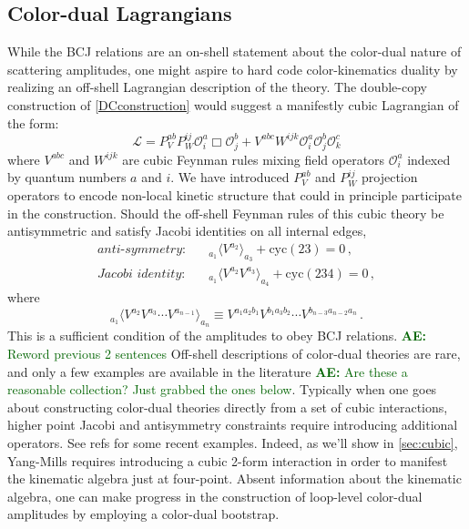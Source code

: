 \documentclass[11pt,letter]{article}
\newcommand{\ace}[1]{\textcolor{darkgreen}{\textbf{AE:}{ #1}}}
\begin{document}
\subsection{Color-dual Lagrangians}\label{offShellCK}
While the BCJ relations are an on-shell statement about the color-dual
nature of scattering amplitudes, one might aspire to hard code
color-kinematics duality by realizing an off-shell Lagrangian
description of the theory. The double-copy construction of
\cref{DCconstruction} would suggest a manifestly cubic Lagrangian of
the form:
\begin{equation}
\mathcal{L} = P_V^{ab}P_W^{ij}\mathcal{O}^a_i \Box \mathcal{O}^b_j +  V^{abc} W^{ijk}\mathcal{O}^a_i \mathcal{O}^b_j \mathcal{O}^c_k
\end{equation}
where $V^{abc}$ and $W^{ijk}$ are cubic Feynman rules mixing field
operators $\mathcal{O}^{a}_i$ indexed by quantum numbers $a$ and
$i$. We have introduced $P_V^{ab}$ and $P_W^{ij}$ projection operators
to encode non-local kinetic structure that could in principle
participate in the construction. Should the off-shell Feynman rules of
this cubic theory be antisymmetric and satisfy Jacobi identities on
all internal edges,
\begin{align}
\textit{anti-symmetry}:& \quad{}_{a_1}\langle V^{a_2} \rangle_{a_3}+\text{cyc}(23)=0\,,
\\
\textit{Jacobi identity}:& \quad {}_{a_1}\langle V^{a_2} V^{a_3}\rangle_{a_4}+\text{cyc}(234)=0\,,
\end{align}
where 
\begin{equation}
{}_{a_1}\langle V^{a_2}V^{a_3}\cdots V^{a_{n-1}} \rangle_{a_n} \equiv V^{a_1a_2b_1}V^{b_1a_3b_2}\cdots V^{b_{n-3} a_{n-2}a_n}\,.
\end{equation}
This is a sufficient condition of the amplitudes to obey BCJ
relations. \ace{Reword previous 2 sentences} Off-shell descriptions of
color-dual theories are rare, and only a few examples are available in
the literature \cite{Monteiro2011pc, Cheung:2016prv, Cheung:2021zvb,
  Cheung:2020djz, Ben-Shahar:2022ixa, Ben-Shahar:2021zww,
  Ben-Shahar:2021doh}\ace{Are these a reasonable
  collection?  Just grabbed the ones below}. Typically when one goes about constructing color-dual
theories directly from a set of cubic interactions, higher point
Jacobi and antisymmetry constraints require introducing additional
operators. See refs \cite{Ben-Shahar:2022ixa} for some recent
examples. Indeed, as we'll show in \cref{sec:cubic}, Yang-Mills
requires introducing a cubic 2-form interaction in order to manifest
the kinematic algebra just at four-point. Absent information about the
kinematic algebra, one can make progress in the construction of
loop-level color-dual amplitudes by employing a color-dual bootstrap.
\end{document}
